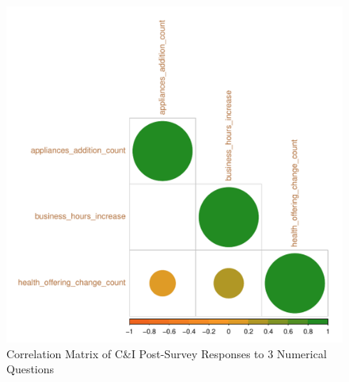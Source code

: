 \begin{figure}
	\centering
	\includegraphics[width=\textwidth]{images/ci_post_corr_plot.pdf}
	\caption{Correlation Matrix of C\&I Post-Survey Responses to 3 Numerical Questions}
	\label{fig:corr-post-ci}
\end{figure}

